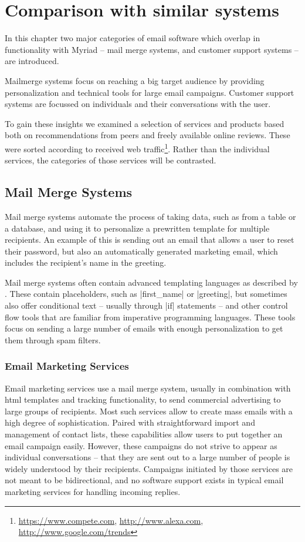 \chapter{Comparison with similar systems}
\label{chapter:Comparison}

In this chapter two major categories of email software which overlap in functionality with Myriad -- mail merge systems, and customer support systems -- are introduced.

Mailmerge systems focus on reaching a big target audience by providing personalization and technical tools for large email campaigns.
Customer support systems are focussed on individuals and their conversations with the user.

To gain these insights we examined a selection of services and products based both on recommendations from peers and freely available online reviews. These were sorted according to received web traffic\footnote{\url{https://www.compete.com}, \url{http://www.alexa.com}, \url{http://www.google.com/trends}}. Rather than the individual services, the categories of those services will be contrasted.

\section{Mail Merge Systems}
\label{section:MailmergeSystems}

Mail merge systems automate the process of taking data, such as from a table or a database, and using it to personalize a prewritten template for multiple recipients. An example of this is sending out an email that allows a user to reset their password, but also an automatically generated marketing email, which includes the recipient's name in the greeting.

Mail merge systems often contain advanced templating languages as described by \citet{mailmergeprogramming}. These contain placeholders, such as |first\_name| or |greeting|, but sometimes also offer conditional text -- usually through |if| statements -- and other control flow tools that are familiar from imperative programming languages. These tools focus on sending a large number of emails with enough personalization to get them through spam filters.

\subsection{Email Marketing Services}

Email marketing services use a mail merge system, usually in combination with \gls{html} templates and tracking functionality, to send commercial advertising to large groups of recipients. Most such services allow to create mass emails with a high degree of sophistication. Paired with straightforward import and management of contact lists, these capabilities allow users to put together an email campaign easily. However, these campaigns do not strive to appear as individual conversations -- that they are sent out to a large number of people is widely understood by their recipients. Campaigns initiated by those services are not meant to be bidirectional, and no software support exists in typical email marketing services for handling incoming replies.

